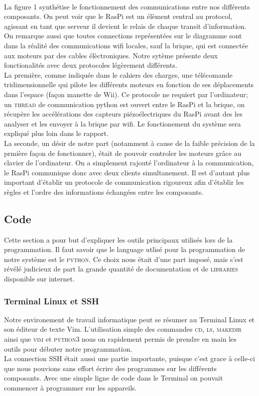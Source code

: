 \documentclass[twoside,twocolumn, 16pt]{article}
\begin{document}
\paragraph{} \indent La figure 1 synthétise le fonctionnement des communications entre nos différents composants. On peut voir que le RasPi est un élèment central au protocol, agissant en tant que serveur il devient le relais de chaque transit d'information. On remarque aussi que toutes connections représentées sur le diagramme sont dans la réalité des communications wifi locales, sauf la brique, qui est connectée aux moteurs par des cables élèctroniques. Notre sytème présente deux fonctionalités avec deux protocoles légèrement différents. \\
\indent La première, comme indiquée dans le cahiers des charges, une télécomande tridimensionnelle qui pilote les différents moteurs en fonction de ses déplacements dans l'espace (façon manette de Wii). Ce protocole ne requiert par l'ordinateur; un \textsc{thread} de communication python est ouvert entre le RasPi et la brique, on récupère les accélérations des capteurs piézoélectriques du RasPi avant des les analyser et les envoyer à la brique par wifi. Le fonctionement du système sera expliqué plus loin dans le rapport. \\ 
\indent La seconde, un désir de notre part (notamment à cause de la faible précision de la prmière façon de fonctionner), était de pouvoir controler les moteurs grâce au clavier de l'ordinateur. On a simplement rajouté l'ordinateur à la communication, le RasPi communique donc avec deux clients simultanement. Il est d'autant plus important d'établir un protocole de communication rigoureux afin d'établir les règles et l'ordre des informations échangées entre les composants.


\subsection{Code}
Cette section a pour but d'expliquer les outils principaux utilisés lors de la programmation. Il faut savoir que le language utlisé pour la programmation de notre système est le \textsc{python}. Ce choix nous était d'une part imposé, mais s'est révélé judicieux de part la grande quantité de documentation et de \textsc{libraries} disponible sur internet.\\
\subsubsection{Terminal Linux et SSH}
Notre environement de travail informatique peut se résumer au Terminal Linux et son éditeur de texte Vim. L'utilisation simple des commandes \textsc{cd, ls, makedir} ainsi que \textsc{vim} et \textsc{python3} nous on rapidement permis de prendre en main les outils pour débuter notre programmation. \\
\indent La connection SSH était aussi une partie importante, puisque c'est grace à celle-ci que nous pouvions sans effort écrire des programmes sur les différents composants. Avec une simple ligne de code dans le Terminal on pouvait commencer à programmer sur les appareils.
\end{document}
